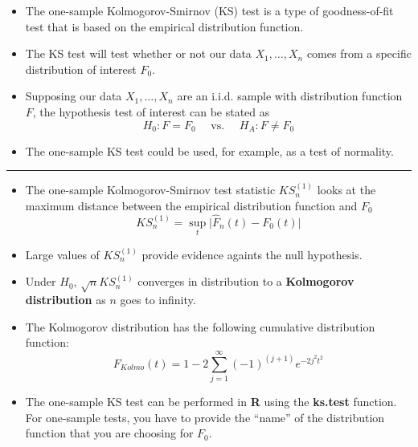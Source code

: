 \documentclass[]{book}
\begin{document}
\begin{itemize}
\item
  The one-sample Kolmogorov-Smirnov (KS) test is a type of goodness-of-fit test
  that is based on the empirical distribution function.
\item
  The KS test will test whether or not our data \(X_{1}, \ldots, X_{n}\) comes
  from a specific distribution of interest \(F_{0}\).
\item
  Supposing our data \(X_{1}, \ldots, X_{n}\) are an i.i.d. sample with distribution
  function \(F\), the hypothesis test of interest can be stated as
  \begin{equation}
  H_{0}: F = F_{0} \quad \textrm{ vs. } \quad H_{A}: F \neq F_{0}
  \end{equation}
\item
  The one-sample KS test could be used, for example, as a test of normality.
\end{itemize}

\begin{center}\rule{0.5\linewidth}{\linethickness}\end{center}

\begin{itemize}
\item
  The one-sample Kolmogorov-Smirnov test statistic \(KS_{n}^{(1)}\) looks at the maximum distance
  between the empirical distribution function and \(F_{0}\)
  \begin{equation}
  KS_{n}^{(1)} = \sup_{t} \big| \hat{F}_{n}(t) - F_{0}(t)  \big|  \nonumber
  \end{equation}
\item
  Large values of \(KS_{n}^{(1)}\) provide evidence againts the null hypothesis.
\item
  Under \(H_{0}\), \(\sqrt{n}KS_{n}^{(1)}\) converges in distribution to a \textbf{Kolmogorov distribution}
  as \(n\) goes to infinity.
\item
  The Kolmogorov distribution has the following cumulative distribution function:
  \begin{equation}
  F_{Kolmo}(t) = 1 - 2\sum_{j=1}^{\infty} (-1)^{(j+1)} e^{-2j^{2}t^{2}} \nonumber
  \end{equation}
\item
  The one-sample KS test can be performed in \textbf{R} using the \textbf{ks.test} function.
  For one-sample tests, you have to provide the ``name'' of the distribution function
  that you are choosing for \(F_{0}\).
\end{itemize}
\end{document}
